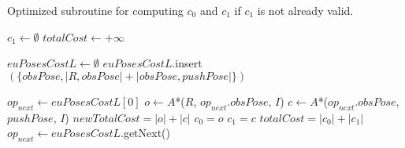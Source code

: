 \begin{algorithm}[H]

  \caption{Optimized subroutine for computing $c_{0}$ and $c_{1}$ if $c_{1}$ is not already valid.}

  \label{alg:04-custom-observation-optimized-compute01c1}
  
  \begin{algorithmic}[1]

      \State $c_{1} \gets \emptyset$
      \State $totalCost \gets +\infty$


      \State $euPosesCostL \gets \emptyset$ 
        \State $euPosesCostL$.insert$(\{obsPose, |{R, obsPose}| + |{obsPose, pushPose}|\})$
      \EndFor

        \State $op_{next} \gets euPosesCostL[0]$
          \State $o \gets A$*($R$, $op_{next}.obsPose$, $I$)
          \State $c \gets A$*($op_{next}.obsPose$, $pushPose$, $I$)
          \State $newTotalCost = |o| + |c|$
            \State $c_{0} = o$
            \State $c_{1} = c$
            \State $totalCost = |c_{0}| + |c_{1}|$
          \EndIf
          \State $op_{next} \gets euPosesCostL$.getNext()
        \EndWhile
      \EndIf
    \EndProcedure

  \end{algorithmic}
\end{algorithm}
